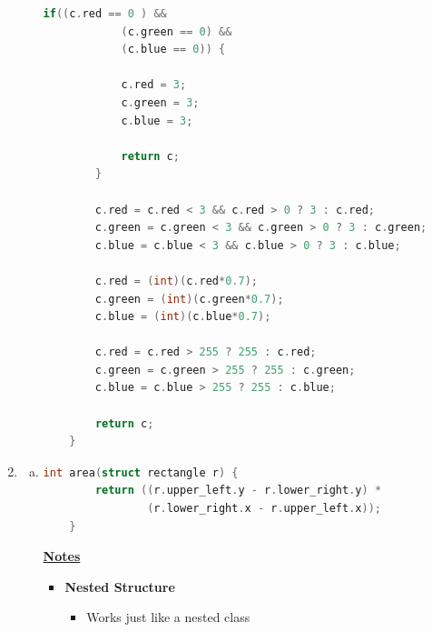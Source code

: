 \documentclass[12pt]{article}
\begin{document}
\begin{enumerate}[1.]
\begin{enumerate}[a)]
\begin{lstlisting}[language=c]
        if((c.red == 0 ) &&
            (c.green == 0) &&
            (c.blue == 0)) {

            c.red = 3;
            c.green = 3;
            c.blue = 3;

            return c;
        }

        c.red = c.red < 3 && c.red > 0 ? 3 : c.red;
        c.green = c.green < 3 && c.green > 0 ? 3 : c.green;
        c.blue = c.blue < 3 && c.blue > 0 ? 3 : c.blue;

        c.red = (int)(c.red*0.7);
        c.green = (int)(c.green*0.7);
        c.blue = (int)(c.blue*0.7);

        c.red = c.red > 255 ? 255 : c.red;
        c.green = c.green > 255 ? 255 : c.green;
        c.blue = c.blue > 255 ? 255 : c.blue;

        return c;
    }
\end{lstlisting}

    \end{enumerate}

    \item

    \bigskip

    \begin{enumerate}[a)]

        \item

\begin{lstlisting}[language=c]
    int area(struct rectangle r) {
        return ((r.upper_left.y - r.lower_right.y) *
                (r.lower_right.x - r.upper_left.x));
    }
\end{lstlisting}

        \bigskip

        \underline{\textbf{Notes}}

        \begin{itemize}
            \item \textbf{Nested Structure}

            \begin{itemize}
                \item Works just like a nested class

                \bigskip


\end{itemize}
\end{itemize}
\end{enumerate}
\end{enumerate}
\end{document}
